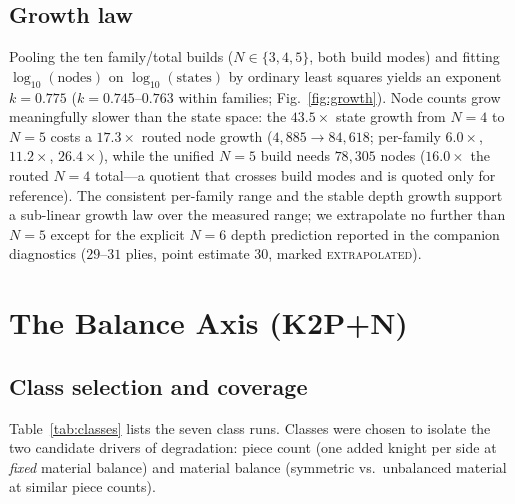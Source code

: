 \documentclass[conference]{IEEEtran}
\newcommand{\tiere}{\textsc{extrapolated}}
\begin{document}
\subsection{Growth law}
Pooling the ten family/total builds ($N\in\{3,4,5\}$, both build modes) and
fitting $\log_{10}(\text{nodes})$ on $\log_{10}(\text{states})$ by ordinary
least squares yields an exponent $k=0.775$ ($k=0.745$--$0.763$ within
families; Fig.~\ref{fig:growth}). Node counts grow meaningfully slower than
the state space: the $43.5\times$ state growth from $N{=}4$ to $N{=}5$
costs a $17.3\times$ routed node growth ($4{,}885\to84{,}618$; per-family
$6.0\times$, $11.2\times$, $26.4\times$), while the unified $N{=}5$ build
needs $78{,}305$ nodes ($16.0\times$ the routed $N{=}4$ total---a quotient
that crosses build modes and is quoted only for reference). The
consistent per-family range and the stable depth growth support a
sub-linear growth law over the measured range; we extrapolate no further
than $N{=}5$ except for the explicit $N{=}6$ depth prediction reported in
the companion diagnostics ($29$--$31$ plies, point estimate $30$, marked
\tiere{}).

\section{The Balance Axis (K2P+N)}
\label{sec:balance}

\subsection{Class selection and coverage}
Table~\ref{tab:classes} lists the seven class runs. Classes were chosen to
isolate the two candidate drivers of degradation: piece count (one added
knight per side at \emph{fixed} material balance) and material balance
(symmetric vs.\ unbalanced material at similar piece counts).
\end{document}
